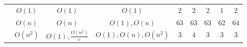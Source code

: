 \begin{table}[ht]
{\begin{tabular}{ >{\scriptsize}c | >{\scriptsize}c | >{\scriptsize}c | >{\scriptsize}c | c | c | c | c | c  }
    \hline \hline
    \multirow{3}{*}{Tianhan} 
    & $O(1)$            & $O(1)$ & $O(1)$  & 2  & 2 & 2 & 1 & 2 \\
    \cline{2-9}
    & $O(n)$            &  $ O(n) $ & $O(1), O(n)$  & 63 & 63 & 63 & 62 & 64 \\
    \cline{2-9}
    & $O(n^2)$          &  $O(1), \frac{O(n^2)}{c}$ & $O(1), O(n), O(n^2)$ & 3 & 4 & 3 & 3 & 3\\
    \hline
    \end{tabular}
    }
\end{table}